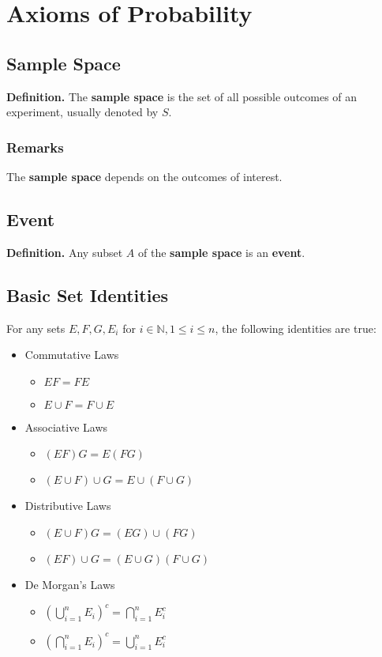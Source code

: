 \documentclass[../st2131_notes.tex]{subfiles}
\begin{document}
\chapter{Axioms of Probability}
\section{Sample Space}
\textbf{Definition.} The \textbf{sample space} is the set of all possible outcomes of an experiment, usually denoted by \(S\).

\subsection{Remarks}
The \textbf{sample space} depends on the outcomes of interest.

\section{Event}
\textbf{Definition.} Any subset \(A\) of the \textbf{sample space} is an \textbf{event}.

\section{Basic Set Identities}
For any sets \(E,F,G,E_i\) for \(i\in\mathbb{N},1\leq i\leq n\), the following identities are true:
\begin{itemize}
	\item Commutative Laws
	\begin{itemize}
		\item\(EF=FE\)
		\item\(E\cup F=F\cup E\)
	\end{itemize}
	\item Associative Laws
	\begin{itemize}
		\item\((EF)G=E(FG)\)
		\item\((E\cup F)\cup G=E\cup(F\cup G)\)
	\end{itemize}
	\item Distributive Laws
	\begin{itemize}
		\item\((E\cup F)G=(EG)\cup(FG)\)
		\item\((EF)\cup G=(E\cup G)(F\cup G)\)
	\end{itemize}
	\item De Morgan's Laws
	\begin{itemize}
		\item\(\left(\bigcup\limits_{i=1}^n E_i\right)^c=\bigcap\limits_{i=1}^nE_i^c\)
		\item\(\left(\bigcap\limits_{i=1}^n E_i\right)^c=\bigcup\limits_{i=1}^nE_i^c\)
	\end{itemize}
\end{itemize}
\end{document}
